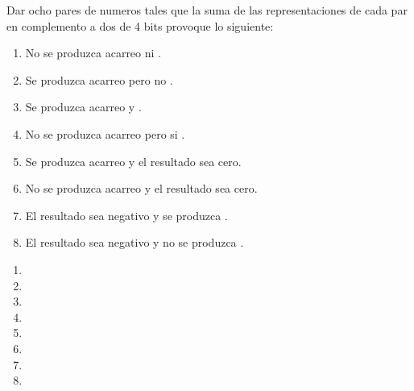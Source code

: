 \begin{enunciado}{\ejercicio}
  Dar ocho pares de numeros tales que la suma de las representaciones de cada
  par en complemento a dos de 4 bits provoque lo siguiente:

  \begin{enumerate}[label=\arabic*)]
    \item No se produzca acarreo ni \overflow.
    \item Se produzca acarreo pero no \overflow.
    \item Se produzca acarreo y \overflow.
    \item No se produzca acarreo pero si \overflow.
    \item Se produzca acarreo y el resultado sea cero.
    \item No se produzca acarreo y el resultado sea cero.
    \item El resultado sea negativo y se produzca \overflow.
    \item El resultado sea negativo y no se produzca \overflow.
  \end{enumerate}
\end{enunciado}

\begin{enumerate}[label=\arabic*)]
  \item {}
  \item {}
  \item {}
  \item {}
  \item {}
  \item {}
  \item {}
  \item {}

\end{enumerate}

\begin{aportes}
  \item {}
\end{aportes}
